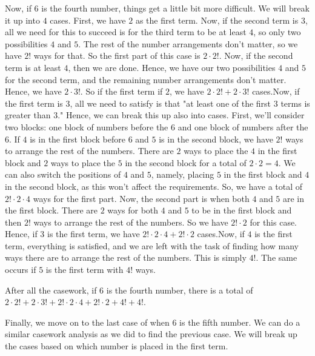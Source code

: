 \begin{enumerate}
 Now, if $6$ is the fourth number, things get a little bit more difficult. We will break it up into $4$ cases. First, we have $2$ as the first term. Now, if the second term is $3$, all we need for this to succeed is for the third term to be at least $4$, so only two possibilities $4$ and $5$. The rest of the number arrangements don't matter, so we have $2!$ ways for that. So the first part of this case is $2 \cdot 2!$. Now, if the second term is at least $4$, then we are done. Hence, we have our two possibilities $4$ and $5$ for the second term, and the remaining number arrangements don't matter. Hence, we have $2 \cdot 3!$. So if the first term if $2$, we have $2 \cdot 2! + 2 \cdot 3!$ cases.Now, if the first term is $3$, all we need to satisfy is that "at least one of the first $3$ terms is greater than $3$." Hence, we can break this up also into cases. First, we'll consider two blocks: one block of numbers before the $6$ and one block of numbers after the $6$. If $4$ is in the first block before $6$ and $5$ is in the second block, we have $2!$ ways to arrange the rest of the numbers. There are $2$ ways to place the $4$ in the first block and $2$ ways to place the $5$ in the second block for a total of $2 \cdot 2 = 4$. We can also switch the positions of $4$ and $5$, namely, placing $5$ in the first block and $4$ in the second block, as this won't affect the requirements. So, we have a total of $2! \cdot 2 \cdot 4$ ways for the first part. Now, the second part is when both $4$ and $5$ are in the first block. There are $2$ ways for both $4$ and $5$ to be in the first block and then $2!$ ways to arrange the rest of the numbers. So we have $2! \cdot 2$ for this case. Hence, if $3$ is the first term, we have $2! \cdot 2 \cdot 4 + 2! \cdot 2$ cases.Now, if $4$ is the first term, everything is satisfied, and we are left with the task of finding how many ways there are to arrange the rest of the numbers. This is simply $4!$. The same occurs if $5$ is the first term with $4!$ ways. 

 After all the casework, if $6$ is the fourth number, there is a total of $2 \cdot 2! + 2 \cdot 3! + 2! \cdot 2 \cdot 4 + 2! \cdot 2 + 4! + 4!$. 

 Finally, we move on to the last case of when $6$ is the fifth number. We can do a similar casework analysis as we did to find the previous case. We will break up the cases based on which number is placed in the first term. 


\end{enumerate}
